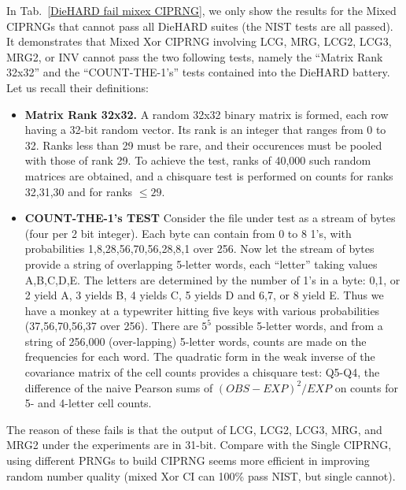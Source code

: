 In Tab.~\ref{DieHARD fail mixex CIPRNG}, we only show the results for the Mixed CIPRNGs that cannot pass all DieHARD suites (the NIST tests are all passed). It demonstrates that Mixed Xor CIPRNG involving LCG, MRG, LCG2, LCG3, MRG2, or INV cannot pass the two following tests, namely the ``Matrix Rank 32x32'' and the ``COUNT-THE-1's'' tests contained into the DieHARD battery. Let us recall their definitions:

\begin{itemize}
 \item \textbf{Matrix Rank 32x32.} A random 32x32 binary matrix is formed, each row having a 32-bit random vector. Its rank is an integer that ranges from 0 to 32. Ranks less than 29 must be rare, and their occurences must be pooled with those of rank 29. To achieve the test, ranks of 40,000 such random matrices are obtained, and a chisquare test is performed on counts for ranks 32,31,30 and for ranks $\leq29$.

 \item \textbf{COUNT-THE-1's TEST} Consider the file under test as a stream of bytes (four per  2 bit integer).  Each byte can contain from 0 to 8 1's, with probabilities 1,8,28,56,70,56,28,8,1 over 256.  Now let the stream of bytes provide a string of overlapping  5-letter words, each ``letter'' taking values A,B,C,D,E. The letters are determined by the number of 1's in a byte: 0,1, or 2 yield A, 3 yields B, 4 yields C, 5 yields D and 6,7, or 8 yield E. Thus we have a monkey at a typewriter hitting five keys with various probabilities (37,56,70,56,37 over 256).  There are $5^5$ possible 5-letter words, and from a string of 256,000 (over-lapping) 5-letter words, counts are made on the frequencies for each word.   The quadratic form in the weak inverse of the covariance matrix of the cell counts provides a chisquare test: Q5-Q4, the difference of the naive Pearson sums of $(OBS-EXP)^2/EXP$ on counts for 5- and 4-letter cell counts.
\end{itemize}

The reason of these fails is that the output of LCG, LCG2, LCG3, MRG, and MRG2 under the experiments are in 31-bit. Compare with the Single CIPRNG, using different PRNGs to build CIPRNG seems more efficient in improving random number quality (mixed Xor CI can 100\% pass NIST, but single cannot).

